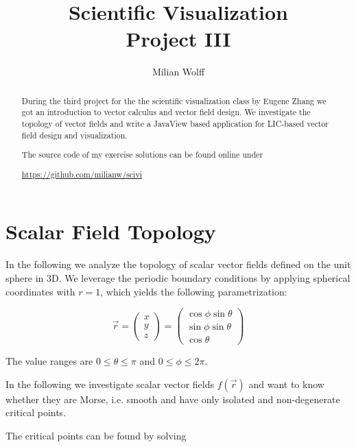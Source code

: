 \documentclass[a4paper,10pt,notitlepage]{scrartcl}
\title{Scientific Visualization\\Project III}
\author{Milian Wolff}
\begin{document}
\maketitle

\begin{abstract}
During the third project for the the scientific visualization class by Eugene
Zhang we got an introduction to vector calculus and vector field design. We
investigate the topology of vector fields and write a JavaView based
application for LIC-based vector field design and visualization.

The source code of my exercise solutions can be found online under

\begin{center}\url{https://github.com/milianw/scivi}\end{center}
\end{abstract}

\begingroup
\let\clearpage\relax

\tableofcontents
\endgroup

\section{Scalar Field Topology}

In the following we analyze the topology of scalar vector fields defined on
the unit sphere in 3D. We leverage the periodic boundary conditions by applying
spherical coordinates with $r = 1$, which yields the following parametrization:

\begin{equation}
 \vec{r} = \left( \begin{array}{c} x \\ y \\ z \end{array} \right)
        = \left( \begin{array}{c} \cos \phi \sin \theta \\ \sin \phi \sin
\theta \\ \cos \theta \end{array} \right)
\end{equation}

The value ranges are $0 \leq \theta \leq \pi$ and
$0 \leq \phi \leq 2 \pi$.

In the following we investigate scalar vector fields $f(\vec{r})$ and want to
know whether they are Morse, i.e. smooth and have only isolated
and non-degenerate critical points.

The critical points can be found by solving
\end{document}

